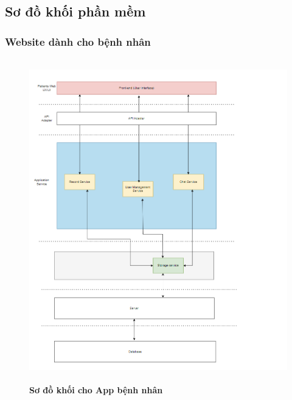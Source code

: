 \subsection{Sơ đồ khối phần mềm}

\subsubsection{Website dành cho bệnh nhân}
\mbox{}

\begin{figure}[H]
  \centering
  \includegraphics[width=12cm,height=14cm]{Images/system/fmECG_architecture-Patient.drawio.png}
  \caption[Sơ đồ khối cho App bệnh nhân]{\bfseries \fontsize{12pt}{0pt}\selectfont Sơ đồ khối cho App bệnh nhân}
  \label{fmECG_architecture-Patient} %
\end{figure}

